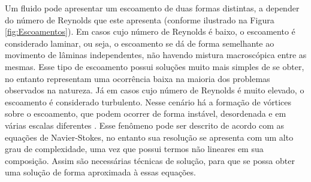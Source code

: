 \documentclass[_ArquivoPrincipal.tex]{subfiles}
\begin{document}
Um fluido pode apresentar um escoamento de duas formas distintas, a depender do número de Reynolds que este apresenta (conforme ilustrado na Figura \ref{fig:Escoamentos}). Em casos cujo número de Reynolds é baixo, o escoamento é considerado laminar, ou seja, o escoamento se dá de forma semelhante ao movimento de lâminas independentes, não havendo mistura macroscópica entre as mesmas. Esse tipo de escoamento possui soluções muito mais simples de se obter, no entanto representam uma ocorrência baixa na maioria dos problemas observados na natureza. Já em casos cujo número de Reynolds é muito elevado, o escoamento é considerado turbulento. Nesse cenário há a formação de vórtices sobre o escoamento, que podem ocorrer de forma instável, desordenada e em várias escalas diferentes \cite{popiolek2005analise,shaughnessy2005introduction}. Esse fenômeno pode ser descrito de acordo com as equações de Navier-Stokes, no entanto sua resolução se apresenta com um alto grau de complexidade, uma vez que possui termos não lineares em sua composição. Assim são necessárias técnicas de solução, para que se possa obter uma solução de forma aproximada à essas equações.
\end{document}
